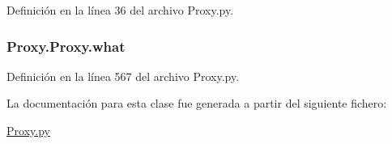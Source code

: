 Definición en la línea 36 del archivo Proxy.\-py.

\hypertarget{class_proxy_1_1_proxy_adf0eb725567f57446e803fdb9f665132}{
\subsubsection[{what}]{\setlength{\rightskip}{0pt plus 5cm}Proxy.\-Proxy.\-what}}\label{class_proxy_1_1_proxy_adf0eb725567f57446e803fdb9f665132}


Definición en la línea 567 del archivo Proxy.\-py.



La documentación para esta clase fue generada a partir del siguiente fichero\-:\begin{DoxyCompactItemize}
\item 
\hyperlink{_proxy_8py}{Proxy.\-py}\end{DoxyCompactItemize}
